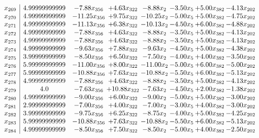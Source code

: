 \documentclass[8pt]{article}
\begin{document}
\[\begin{array}{c| c c@{\hskip 2pt} c@{\hskip 2pt} c@{\hskip 2pt} c@{\hskip 2pt} c@{\hskip 2pt} c@{\hskip 2pt} }
 x_{269}   &  4.99999999999 & -7.88 x_{356} & +  4.63 x_{322} & -8.88 x_{2} & -3.50 x_{5} & +  5.00 x_{382} & -4.13 x_{202}\\
 x_{270}   &  4.99999999999 & -11.25 x_{356} & +  9.75 x_{322} & -10.25 x_{2} & -5.00 x_{5} & +  5.00 x_{382} & -4.75 x_{202}\\
 x_{271}   &  4.99999999999 & -11.13 x_{356} & +  6.38 x_{322} & -10.13 x_{2} & -4.50 x_{5} & +  6.00 x_{382} & -4.88 x_{202}\\
 x_{272}   &  4.99999999999 & -7.88 x_{356} & +  4.63 x_{322} & -8.88 x_{2} & -3.50 x_{5} & +  5.00 x_{382} & -4.13 x_{202}\\
 x_{273}   &  4.99999999999 & -7.88 x_{356} & +  4.63 x_{322} & -8.88 x_{2} & -3.50 x_{5} & +  5.00 x_{382} & -4.13 x_{202}\\
 x_{274}   &  4.99999999999 & -9.63 x_{356} & +  7.88 x_{322} & -9.63 x_{2} & -4.50 x_{5} & +  5.00 x_{382} & -4.38 x_{202}\\
 x_{275}   &  3.99999999999 & -8.50 x_{356} & +  6.50 x_{322} & -7.50 x_{2} & -4.00 x_{5} & +  4.00 x_{382} & -3.50 x_{202}\\
 x_{276}   &  5.99999999999 & -11.00 x_{356} & +  8.00 x_{322} & -11.00 x_{2} & -5.00 x_{5} & +  6.00 x_{382} & -5.00 x_{202}\\
 x_{277}   &  5.99999999999 & -10.88 x_{356} & +  7.63 x_{322} & -10.88 x_{2} & -5.50 x_{5} & +  6.00 x_{382} & -5.13 x_{202}\\
 x_{278}   &  4.99999999999 & -7.88 x_{356} & +  4.63 x_{322} & -8.88 x_{2} & -3.50 x_{5} & +  5.00 x_{382} & -4.13 x_{202}\\
 x_{279}   &  4.0 & -7.63 x_{356} & + 10.88 x_{322} & -7.63 x_{2} & -4.50 x_{5} & +  2.00 x_{382} & -1.38 x_{202}\\
 x_{280}   &  4.99999999999 & -9.00 x_{356} & +  6.00 x_{322} & -9.00 x_{2} & -5.00 x_{5} & +  5.00 x_{382} & -3.00 x_{202}\\
 x_{281}   &  2.99999999999 & -7.00 x_{356} & +  4.00 x_{322} & -7.00 x_{2} & -3.00 x_{5} & +  4.00 x_{382} & -3.00 x_{202}\\
 x_{282}   &  3.99999999999 & -9.75 x_{356} & +  6.25 x_{322} & -8.75 x_{2} & -4.00 x_{5} & +  5.00 x_{382} & -4.25 x_{202}\\
 x_{283}   &  5.99999999999 & -10.88 x_{356} & +  7.63 x_{322} & -10.88 x_{2} & -5.50 x_{5} & +  6.00 x_{382} & -5.13 x_{202}\\
 x_{284}   &  4.99999999999 & -8.50 x_{356} & +  7.50 x_{322} & -8.50 x_{2} & -5.00 x_{5} & +  4.00 x_{382} & -2.50 x_{202}\\

\end{array}\]
\end{document}

